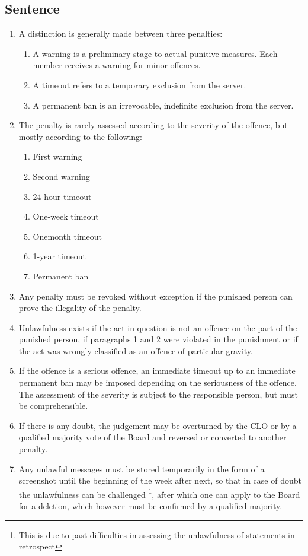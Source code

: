 \documentclass{article}
\begin{document}
\subsection{Sentence}
\begin{enumerate}[(1)]
	\item A distinction is generally made between three penalties:
	\begin{enumerate}[(1)]
		\item A warning is a preliminary stage to actual punitive measures. Each member receives a warning for minor offences.
		\item A timeout refers to a temporary exclusion from the server.
		\item A permanent ban is an irrevocable, indefinite exclusion from the server.
	\end{enumerate}
	\item The penalty is rarely assessed according to the severity of the offence, but mostly according to the following:
	\begin{enumerate}[1.]
		\item First warning
		\item Second warning
		\item 24-hour timeout
		\item One-week timeout
		\item One\-month timeout
		\item 1-year timeout
		\item Permanent ban
	\end{enumerate}
	\item Any penalty must be revoked without exception if the punished person can prove the illegality of the penalty.
	\item Unlawfulness exists if the act in question is not an offence on the part of the punished person, if paragraphs 1 and 2 were violated in the punishment or if the act was wrongly classified as an offence of particular gravity.
	\item If the offence is a serious offence, an immediate timeout up to an immediate permanent ban may be imposed depending on the seriousness of the offence. The assessment of the severity is subject to the responsible person, but must be comprehensible. 
	\item If there is any doubt, the judgement may be overturned by the CLO or by a qualified majority vote of the Board and reversed or converted to another penalty.
	\item Any unlawful messages must be stored temporarily in the form of a screenshot until the beginning of the week after next, so that in case of doubt the unlawfulness can be challenged \footnote{This is due to past difficulties in assessing the unlawfulness of statements in retrospect}, after which one can apply to the Board for a deletion, which however must be confirmed by a qualified majority.

\end{enumerate}
\end{document}

